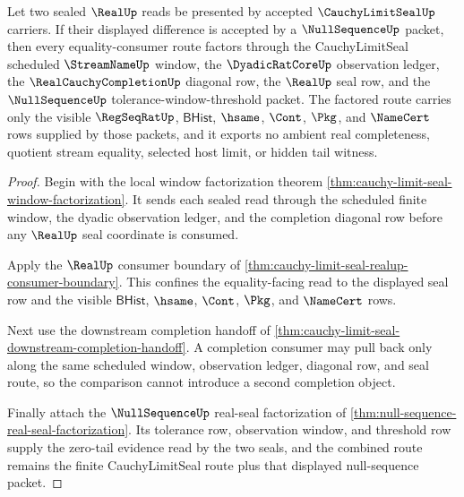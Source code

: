 \begin{theorem}
\label{thm:cauchy-limit-seal-nullsequence-factorization}
Let two sealed $\RealUp$ reads be presented by accepted $\CauchyLimitSealUp$ carriers. If their displayed difference is accepted by a $\NullSequenceUp$ packet, then every equality-consumer route factors through the CauchyLimitSeal scheduled $\StreamNameUp$ window, the $\DyadicRatCoreUp$ observation ledger, the $\RealCauchyCompletionUp$ diagonal row, the $\RealUp$ seal row, and the $\NullSequenceUp$ tolerance-window-threshold packet. The factored route carries only the visible $\RegSeqRatUp$, $\mathsf{BHist}$, $\hsame$, $\Cont$, $\Pkg$, and $\NameCert$ rows supplied by those packets, and it exports no ambient real completeness, quotient stream equality, selected host limit, or hidden tail witness.
\end{theorem}
\begin{proof}
Begin with the local window factorization theorem \autoref{thm:cauchy-limit-seal-window-factorization}. It sends each sealed read through the scheduled finite window, the dyadic observation ledger, and the completion diagonal row before any $\RealUp$ seal coordinate is consumed.

Apply the $\RealUp$ consumer boundary of \autoref{thm:cauchy-limit-seal-realup-consumer-boundary}. This confines the equality-facing read to the displayed seal row and the visible $\mathsf{BHist}$, $\hsame$, $\Cont$, $\Pkg$, and $\NameCert$ rows.

Next use the downstream completion handoff of \autoref{thm:cauchy-limit-seal-downstream-completion-handoff}. A completion consumer may pull back only along the same scheduled window, observation ledger, diagonal row, and seal route, so the comparison cannot introduce a second completion object.

Finally attach the $\NullSequenceUp$ real-seal factorization of \autoref{thm:null-sequence-real-seal-factorization}. Its tolerance row, observation window, and threshold row supply the zero-tail evidence read by the two seals, and the combined route remains the finite CauchyLimitSeal route plus that displayed null-sequence packet.
\end{proof}

